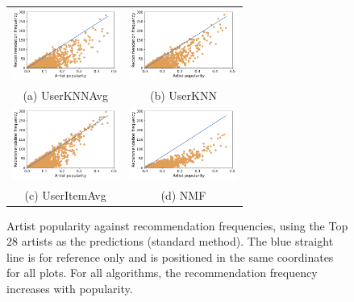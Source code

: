 \documentclass{article}
\begin{document}
\begin{figure}[ht]
\centering
\begin{tabular}{cc}
  \includegraphics[width=35mm]{img/sampl_28_UserKNNAvg.png} &   \includegraphics[width=35mm]{img/sampl_28_UserKNN.png} \\
(a) UserKNNAvg & (b) UserKNN \\[6pt]
 \includegraphics[width=35mm]{img/sampl_28_UserItemAvg.png} &   \includegraphics[width=35mm]{img/sampl_28_NMF.png} \\
(c) UserItemAvg & (d) NMF \\[6pt]
\end{tabular}
\caption{Artist popularity against recommendation frequencies, using the Top 28 artists as the predictions (standard method).
The blue straight line is for reference only and is positioned in the same coordinates for all plots. 
For all algorithms, the recommendation frequency increases 
with popularity.}
\label{fig:std}
\end{figure}
\end{document}
